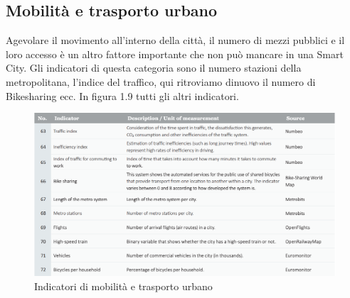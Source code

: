 \subsection{Mobilità e trasporto urbano}
Agevolare il movimento all'interno della città, il numero di mezzi pubblici e il loro accesso è un altro fattore importante che non può mancare in una Smart City. Gli indicatori di questa categoria sono il numero stazioni della metropolitana, l'indice del traffico, qui ritroviamo dinuovo il numero di Bikesharing ecc.
In figura 1.9 tutti gli altri indicatori.
\begin{figure}[ht]
	\begin{center}
		\includegraphics[width=320bp]{img/indicatori_trasporti_urbani.png}
		\caption{Indicatori di mobilità e trasporto urbano}
	\end{center}
\end{figure}